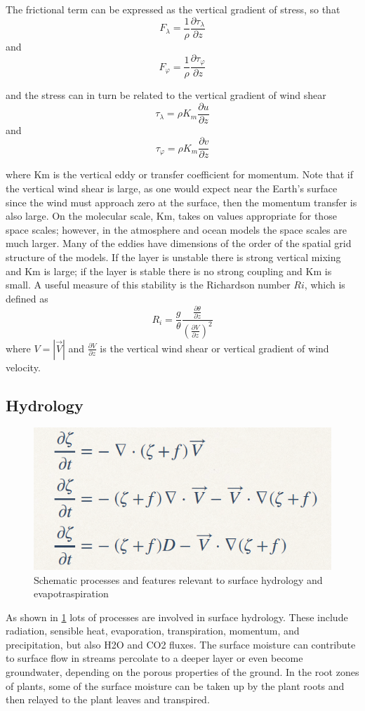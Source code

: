 The frictional term can be expressed as the vertical gradient of stress, so that $$F_\lambda = \frac{1}{\rho} \frac{\partial \tau_\lambda}{\partial z}$$
and $$F_\varphi = \frac{1}{\rho} \frac{\partial \tau_\varphi}{\partial z}$$


and the stress can in turn be related to the vertical gradient of wind shear
$$\tau_\lambda = \rho K_m \frac{\partial u}{\partial z}$$
and $$\tau_\varphi = \rho K_m \frac{\partial v}{\partial z}$$

where Km is the vertical eddy or transfer coefficient for momentum. Note that if the vertical wind shear is large, as one would expect near the Earth's surface since the wind must approach zero at the surface, then the momentum transfer is also large. On the molecular scale, Km, takes on values appropriate for those space scales; however, in the atmosphere and ocean models the space scales are much larger. Many of the eddies have dimensions of the order of the spatial grid structure of the models.
If the layer is unstable there is strong vertical mixing and Km is large; if the layer is stable there is no strong coupling and Km is small. A useful measure of this stability is the Richardson number $Ri$, which is defined as
$$R_i = \frac{g}{\theta} \frac{\frac{\partial \theta}{\partial z}}{\left( \frac{\partial V}{\partial z} \right)^2}$$
where $V = \left| \vec{V} \right|$ and $\frac{\partial V}{\partial z}$ is the vertical wind shear or vertical gradient of wind velocity.

\subsection{Hydrology}
\begin{figure}[htp!]
	\centering
	\includegraphics[width=0.5\linewidth]{uploads/15image.png}
	\caption{Schematic processes and features relevant to surface hydrology and evapotraspiration}
	\label{fig: fig 2}
\end{figure}
As shown in \ref{fig: fig 2} lots of processes are involved in surface hydrology. These include radiation, sensible heat, evaporation, transpiration, momentum, and precipitation, but also H2O and CO2 fluxes. The surface moisture can contribute to surface flow in streams percolate to a deeper layer or even become groundwater, depending on the porous properties of the ground. In the root zones of plants, some of the surface moisture can be taken up by the plant roots and then relayed to the plant leaves and transpired.


